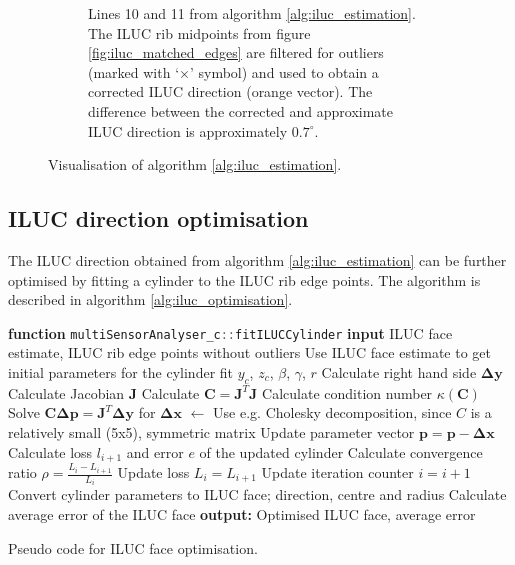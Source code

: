 \begin{figure}[H]
\begin{subfigure}[c]{0.45\textwidth}
        \caption{Lines 10 and 11 from algorithm \ref{alg:iluc_estimation}. The ILUC rib midpoints from figure \ref{fig:iluc_matched_edges} are filtered for outliers (marked with `$\times$' symbol) and used to obtain a corrected ILUC direction (orange vector). The difference between the corrected and approximate ILUC direction is approximately $0.7^{\circ}$.}
        \label{fig:iluc_corrected_direction}
    \end{subfigure}
    \caption{Visualisation of algorithm \ref{alg:iluc_estimation}.}
    \label{fig:iluc_estimation}
\end{figure}

\subsection{ILUC direction optimisation}
The ILUC direction obtained from algorithm \ref{alg:iluc_estimation} can be further optimised by fitting a cylinder to the ILUC rib edge points. The algorithm is described in algorithm \ref{alg:iluc_optimisation}.
\begin{algorithm}[H]
    \begin{algorithmic}[1]
        \State \textbf{function} \lstinline[language=C]|multiSensorAnalyser_c::fitILUCCylinder|
        \State \textbf{input} ILUC face estimate, ILUC rib edge points without outliers
        \State Use ILUC face estimate to get initial parameters for the cylinder fit $y_c$, $z_c$, $\beta$, $\gamma$, $r$
        \State Calculate right hand side $\mathbf{\Delta y}$
        \State Calculate Jacobian $\mathbf{J}$
        \State Calculate $\mathbf{C} = \mathbf{J}^T \mathbf{J}$
        \State Calculate condition number $\kappa(\mathbf{C})$
        \State Solve $\mathbf{C} \mathbf{\Delta p} = \mathbf{J}^T \mathbf{\Delta y}$ for $\mathbf{\Delta x}$ $\leftarrow$ Use e.g. Cholesky decomposition, since $C$ is a relatively small (5x5), symmetric matrix
        \State Update parameter vector $\mathbf{p} = \mathbf{p} - \mathbf{\Delta x}$
        \State Calculate loss $l_{i+1}$ and error $e$ of the updated cylinder
        \State Calculate convergence ratio $\rho = \frac{L_i - L_{i+1}}{L_i}$
        \State Update loss $L_i = L_{i+1}$
        \State Update iteration counter $i = i + 1$
        \EndWhile
        \State Convert cylinder parameters to ILUC face; direction, centre and radius
        \State Calculate average error of the ILUC face
        \State \textbf{output: } Optimised ILUC face, average error
    \end{algorithmic}
    \caption{Pseudo code for ILUC face optimisation.}
    \label{alg:iluc_optimisation}
\end{algorithm}
